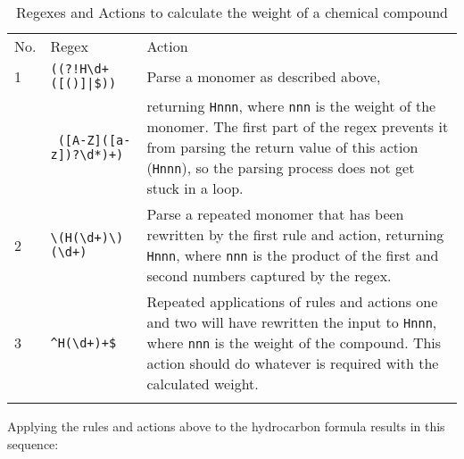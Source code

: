 \begin{table}[ht]
    \caption{Regexes and Actions to calculate the weight of a chemical
    compound}
    \empty{}\label{Regexes and Actions to calculate the weight of a
    chemical compound}
    \begin{tabular}{llp{\chemicalactionwidth}}

        \tabletopline{}%
        No.   & Regex                       & Action \\
        \tablemiddleline{}%
        1     & \verb'((?!H\d+([()]|$))'    & Parse a monomer as described above,  \\
              & \verb' ([A-Z]([a-z])?\d*)+)'& returning \verb!Hnnn!, where \verb!nnn! is
                                              the weight of the monomer.  The first part
                                              of the regex prevents it from parsing the
                                              return value of this action (\verb!Hnnn!),
                                              so the parsing process does not get stuck in
                                              a loop.  \\
        2     & \verb!\(H(\d+)\)(\d+)!      & Parse a repeated monomer that has been
                                              rewritten by the first rule and action,
                                              returning \verb!Hnnn!, where \verb!nnn! is
                                              the product of the first and second numbers
                                              captured by the regex.  \\
        3     & \verb!^H(\d+)+$!            & Repeated applications of rules and
                                              actions one and two will have rewritten the
                                              input to \verb!Hnnn!, where \verb!nnn! is
                                              the weight of the compound.  This action
                                              should do whatever is required with the
                                              calculated weight.  \\
        \tablebottomline{}%

    \end{tabular}
\end{table}

Applying the rules and actions above to the hydrocarbon formula results in
this sequence:

